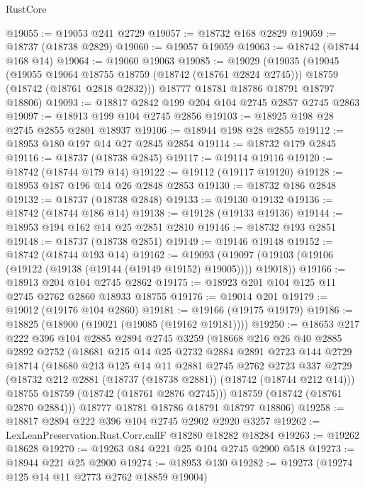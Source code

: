 \begin{lexlean}{RustCore}
\begin{coremodule}
@19055 := @19053 @241 @2729
@19057 := @18732 @168 @2829
@19059 := @18737 (@18738 @2829)
@19060 := @19057 @19059
@19063 := @18742 (@18744 @168 @14)
@19064 := @19060 @19063
@19085 := @19029
    (@19035
      (@19045
        (@19055 @19064 @18755 @18759 (@18742 (@18761 @2824 @2745)))
        @18759
        (@18742 (@18761 @2818 @2832)))
      @18777
      @18781
      @18786
      @18791
      @18797
      @18806)
@19093 := @18817 @2842 @199 @204 @104 @2745 @2857 @2745 @2863
@19097 := @18913 @199 @104 @2745 @2856
@19103 := @18925 @198 @28 @2745 @2855 @2801 @18937
@19106 := @18944 @198 @28 @2855
@19112 := @18953 @180 @197 @14 @27 @2845 @2854
@19114 := @18732 @179 @2845
@19116 := @18737 (@18738 @2845)
@19117 := @19114 @19116
@19120 := @18742 (@18744 @179 @14)
@19122 := @19112 (@19117 @19120)
@19128 := @18953 @187 @196 @14 @26 @2848 @2853
@19130 := @18732 @186 @2848
@19132 := @18737 (@18738 @2848)
@19133 := @19130 @19132
@19136 := @18742 (@18744 @186 @14)
@19138 := @19128 (@19133 @19136)
@19144 := @18953 @194 @162 @14 @25 @2851 @2810
@19146 := @18732 @193 @2851
@19148 := @18737 (@18738 @2851)
@19149 := @19146 @19148
@19152 := @18742 (@18744 @193 @14)
@19162 := @19093 (@19097 (@19103 (@19106 (@19122 (@19138 (@19144 (@19149 @19152) @19005)))) @19018))
@19166 := @18913 @204 @104 @2745 @2862
@19175 := @18923 @201 @104 @125 @11 @2745 @2762 @2860 @18933 @18755
@19176 := @19014 @201
@19179 := @19012 (@19176 @104 @2860)
@19181 := @19166 (@19175 @19179)
@19186 := @18825 (@18900 (@19021 (@19085 (@19162 @19181))))
@19250 := @18653
    @217
    @222
    @396
    @104
    @2885
    @2894
    @2745
    @3259
    (@18668
      @216
      @26
      @40
      @2885
      @2892
      @2752
      (@18681
        @215
        @14
        @25
        @2732
        @2884
        @2891
        @2723
        @144
        @2729
        @18714
        (@18680
          @213
          @125
          @14
          @11
          @2881
          @2745
          @2762
          @2723
          @337
          @2729
          (@18732 @212 @2881 (@18737 (@18738 @2881)) (@18742 (@18744 @212 @14)))
          @18755
          @18759
          (@18742 (@18761 @2876 @2745)))
        @18759
        (@18742 (@18761 @2870 @2884)))
      @18777
      @18781
      @18786
      @18791
      @18797
      @18806)
@19258 := @18817 @2894 @222 @396 @104 @2745 @2902 @2920 @3257
@19262 := LexLeanPreservation.Rust.Corr.callF @18280 @18282 @18284
@19263 := @19262 @18628
@19270 := @19263 @84 @221 @25 @104 @2745 @2900 @518
@19273 := @18944 @221 @25 @2900
@19274 := @18953 @130
@19282 := @19273 (@19274 @125 @14 @11 @2773 @2762 @18859 @19004)

\end{coremodule}
\end{lexlean}
